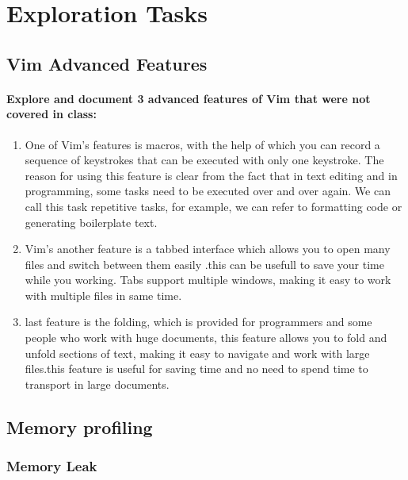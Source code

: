 \documentclass[11pt]{article}
\begin{document}
\section{Exploration Tasks}
\subsection{Vim Advanced Features}
\paragraph{Explore and document 3 advanced features of Vim that were not covered in class:}

\begin{enumerate}
    \item One of Vim’s features is macros, with the help of which you can record a sequence
 of keystrokes that can be executed with only one keystroke. The reason for using
 this feature is clear from the fact that in text editing and in programming, some
 tasks need to be executed over and over again. We can call this task repetitive
 tasks, for example, we can refer to formatting code or generating boilerplate text.
    \item Vim’s another feature is a tabbed interface which allows you to open many files and
 switch between them easily .this can be usefull to save your time while you working.
 Tabs support multiple windows, making it easy to work with multiple files in same
 time.
    \item last feature is the folding, which is provided for programmers and some people who
 work with huge documents, this feature allows you to fold and unfold sections of
 text, making it easy to navigate and work with large files.this feature is useful for
 saving time and no need to spend time to transport in large documents.
\end{enumerate}

\subsection{Memory profiling}
\subsubsection{Memory Leak}
\end{document}

